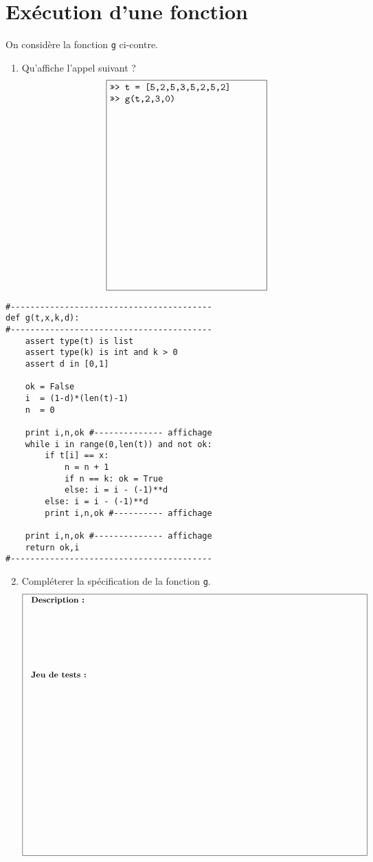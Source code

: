 \documentclass[12pt]{article}
\begin{document}
\section{Exécution d'une fonction}
\begin{minipage}[t]{7cm}
On considère la fonction {\tt g} ci-contre.

\begin{enumerate}
\item Qu'affiche l'appel suivant ?
$$\framebox[5.9cm]{
\begin{minipage}{5.75cm}\tt
>>> t = [5,2,5,3,5,2,5,2]\\
>>> g(t,2,3,0)
\vspace*{6.7cm}

\end{minipage}}$$
\end{enumerate}
\end{minipage}
\hfill
\begin{minipage}[t]{8cm}\footnotesize
\begin{verbatim}
#-----------------------------------------
def g(t,x,k,d):
#-----------------------------------------
    assert type(t) is list
    assert type(k) is int and k > 0
    assert d in [0,1]

    ok = False
    i  = (1-d)*(len(t)-1)
    n  = 0
    
    print i,n,ok #-------------- affichage
    while i in range(0,len(t)) and not ok:
        if t[i] == x:
            n = n + 1
            if n == k: ok = True
            else: i = i - (-1)**d
        else: i = i - (-1)**d
        print i,n,ok #---------- affichage

    print i,n,ok #-------------- affichage
    return ok,i
#-----------------------------------------
\end{verbatim}
\end{minipage}

\begin{enumerate}\setcounter{enumi}{1}
\item Compléterer la spécification de la fonction {\tt g}.
	$$\framebox[14.75cm]{\begin{minipage}{14cm}
	\begin{description}
	\item[Description :]\mbox{} \vspace*{2.5cm}
	
	\item[Jeu de tests :]\mbox{} \vspace*{7.5cm}
	\end{description}
	\end{minipage}}$$
\end{enumerate}

\label{fin}
\end{document}
